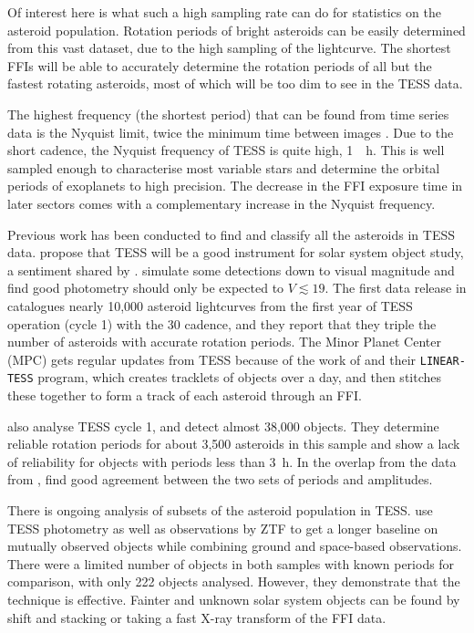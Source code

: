 \documentclass{UCreport}
\begin{document}
Of interest here is what such a high sampling rate can do for statistics on the asteroid population.
Rotation periods of bright asteroids can be easily determined from this vast dataset, due to the high sampling of the lightcurve.
The shortest FFIs will be able to accurately determine the rotation periods of all but the fastest rotating asteroids, most of which will be too dim to see in the TESS data.

The highest frequency (the shortest period) that can be found from time series data is the Nyquist limit, twice the minimum time between images \citep{VanderPlas2018}. 
Due to the short cadence, the Nyquist frequency of TESS is quite high, \qty{1}{\per\hour}.
This is well sampled enough to characterise most variable stars and determine the orbital periods of exoplanets to high precision.
The decrease in the FFI exposure time in later sectors comes with a complementary increase in the Nyquist frequency.

Previous work has been conducted to find and classify all the asteroids in TESS data.
\citet{Pal2018} propose that TESS will be a good instrument for solar system object study, a sentiment shared by \citet{Wong2019}.
\citeauthor{Pal2018} simulate some detections down to  visual magnitude and find good photometry should only be expected to $V \lesssim 19$.
The first data release in \citet{Pal2020} catalogues nearly 10,000 asteroid lightcurves from the first year of TESS operation (cycle 1) with the \qty{30}{\min} cadence, and they report that they triple the number of asteroids with accurate rotation periods.
The Minor Planet Center (MPC) gets regular updates from TESS because of the work of \citet{Woods2021} and their \texttt{LINEAR-TESS} program, which creates tracklets of objects over a day, and then stitches these together to form a track of each asteroid through an FFI.

\citet{McNeill2023} also analyse TESS cycle 1, and detect almost 38,000 objects.
They determine reliable rotation periods for about 3,500 asteroids in this sample and show a lack of reliability for objects with periods less than \qty{3}{\hour}.
In the overlap from the data from \citet{Pal2020}, \citeauthor{McNeill2023} find good agreement between the two sets of periods and amplitudes.

There is ongoing analysis of subsets of the asteroid population in TESS.
\citet{Gowanlock2024} use TESS photometry as well as  observations by ZTF to get a longer baseline on mutually observed objects while combining ground and space-based observations.
There were a limited number of objects in both samples with known periods for comparison, with only 222 objects analysed. However, they demonstrate that the technique is effective.
Fainter and unknown solar system objects can be found by shift and stacking \citep{Holman2019, Payne2019,Rice2020} or taking a fast X-ray transform \citep{Nguyen2024} of the FFI data. 
\end{document}
